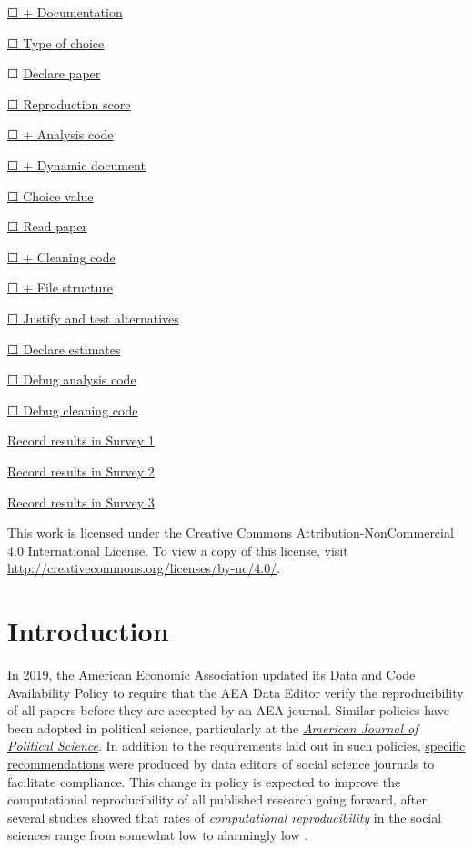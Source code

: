 \documentclass[]{book}
\begin{document}
\protect\hyperlink{paper-level}{☐ + Documentation}

\protect\hyperlink{id-type}{☐ Type of choice}

☐ \protect\hyperlink{declare}{Declare paper}

\protect\hyperlink{score}{☐ Reproduction score}

\protect\hyperlink{ac}{☐ + Analysis code}

\protect\hyperlink{paper-level}{☐ + Dynamic document}

\protect\hyperlink{id-val}{☐ Choice value}

\protect\hyperlink{read-summ}{☐ Read paper}

\protect\hyperlink{cc}{☐ + Cleaning code}

\protect\hyperlink{paper-level}{☐ + File structure}

\protect\hyperlink{test-rob}{☐ Justify and test alternatives}

\protect\hyperlink{declare-estimates}{☐ Declare estimates}

\protect\hyperlink{dac}{☐ Debug analysis code}

\protect\hyperlink{dcc}{☐ Debug cleaning code}

\href{https://berkeley.qualtrics.com/jfe/form/SV_2bO83uJvU9ZiTXv}{Record results in Survey 1}

\href{https://berkeley.qualtrics.com/jfe/form/SV_2gd9Y3XVtjLpZL7}{Record results in Survey 2}

\href{ADD\%20LINK}{Record results in Survey 3}

This work is licensed under the Creative Commons Attribution-NonCommercial 4.0 International License. To view a copy of this license, visit \url{http://creativecommons.org/licenses/by-nc/4.0/}.

\hypertarget{intro}{%
\chapter*{Introduction}\label{intro}}

In 2019, the \href{https://www.aeaweb.org/journals/policies/data-code/}{American Economic Association} updated its Data and Code Availability Policy to require that the AEA Data Editor verify the reproducibility of all papers before they are accepted by an AEA journal. Similar policies have been adopted in political science, particularly at the \href{https://ajps.org/ajps-verification-policy/}{\emph{American Journal of Political Science}}. In addition to the requirements laid out in such policies, \href{https://social-science-data-editors.github.io/guidance/}{specific recommendations} were produced by data editors of social science journals to facilitate compliance. This change in policy is expected to improve the computational reproducibility of all published research going forward, after several studies showed that rates of \emph{computational reproducibility} in the social sciences range from somewhat low to alarmingly low \citep{galiani2018make, chang2015economics, kingi2018reproducibility}.
\end{document}
